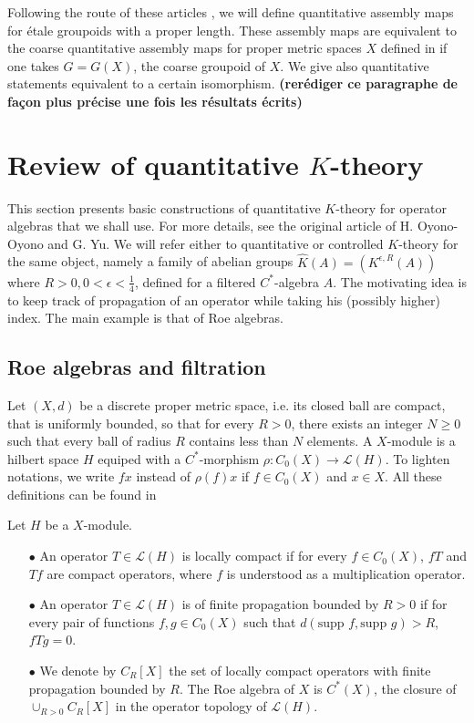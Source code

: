 Following the route of these articles \cite{OY2}\cite{OY3}, we will define quantitative assembly maps for étale groupoids with a proper length. These assembly maps are equivalent to the coarse quantitative assembly maps for proper metric spaces $X$ defined in \cite{OY3} if one takes $G= G(X)$, the coarse groupoid of $X$. We give also quantitative statements equivalent to a certain isomorphism. \textbf{(rerédiger ce paragraphe de façon plus précise une fois les résultats écrits)}\\

\section{Review of quantitative $K$-theory}

This section presents basic constructions of quantitative $K$-theory for operator algebras that we shall use. For more details, see the original article of H. Oyono-Oyono and G. Yu.\cite{OY2} We will refer either to quantitative or controlled $K$-theory for the same object, namely a family of abelian groups $\hat K(A)= (K^{\epsilon,R}(A))$ where $R>0, 0<\epsilon<\frac{1}{4}$, defined for a filtered $C^*$-algebra $A$. The motivating idea is to keep track of propagation of an operator while taking his (possibly higher) index. The main example is that of Roe algebras. \\

\subsection{Roe algebras and filtration}

Let $(X,d)$ be a discrete proper metric space, i.e. its closed ball are compact, that is uniformly bounded, so that for every $R>0$, there exists an integer $N\geq 0$ such that every ball of radius $R$ contains less than $N$ elements. A $X$-module is a hilbert space $H$ equiped with a $C^*$-morphism $\rho : C_0(X)\rightarrow \mathcal L(H)$. To lighten notations, we write $fx$ instead of $\rho(f)x$ if $f\in C_0(X)$ and $x\in X$. All these definitions can be found in \cite{RoeIndex}

\begin{definition}
Let $H$ be a $X$-module.
\begin{itemize}
\item[$\bullet$] An operator $T\in \mathcal L(H)$ is locally compact if for every $f\in C_0(X)$, $fT$ and $Tf$ are compact operators, where $f$ is understood as a multiplication operator.
\item[$\bullet$] An operator $T\in \mathcal L(H)$ is of finite propagation bounded by $R>0$ if for every pair of functions $f,g\in C_0(X)$ such that $d(\text{supp }f , \text{supp }g)>R$, $fTg =0$.
\item[$\bullet$] We denote by $C_R[X]$ the set of locally compact operators with finite propagation bounded by $R$. The Roe algebra of $X$ is $C^*(X)$, the closure of $\cup_{R>0} C_R[X]$ in the operator topology of $\mathcal L(H)$.\\
\end{itemize}
\end{definition} 
 
